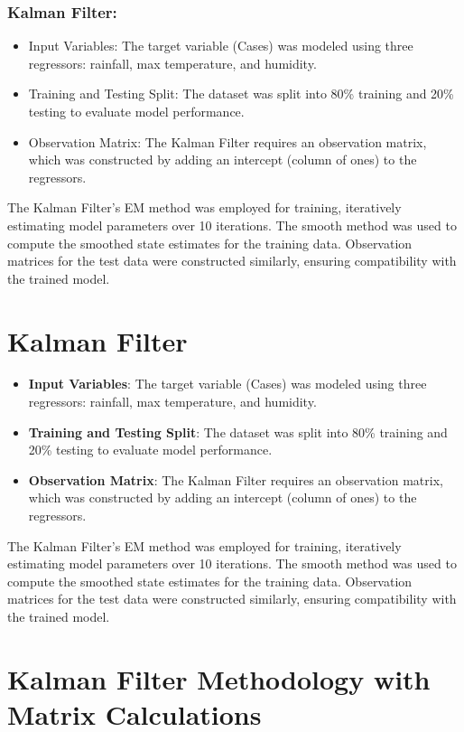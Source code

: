 \subsubsection{Kalman Filter:}
\begin{itemize}
	\item Input Variables: The target variable (Cases) was modeled using three regressors: rainfall, max temperature, and humidity.
	\item Training and Testing Split: The dataset was split into 80\% training and 20\% testing to evaluate model performance.
	\item Observation Matrix: The Kalman Filter requires an observation matrix, which was constructed by adding an intercept (column of ones) to the regressors.
\end{itemize}

The Kalman Filter's EM method was employed for training, iteratively estimating model parameters over 10 iterations. The smooth method was used to compute the smoothed state estimates for the training data. Observation matrices for the test data were constructed similarly, ensuring compatibility with the trained model.

\section{Kalman Filter}

\begin{itemize}
	\item \textbf{Input Variables}: The target variable (Cases) was modeled using three regressors: rainfall, max temperature, and humidity.
	\item \textbf{Training and Testing Split}: The dataset was split into 80\% training and 20\% testing to evaluate model performance.
	\item \textbf{Observation Matrix}: The Kalman Filter requires an observation matrix, which was constructed by adding an intercept (column of ones) to the regressors.
\end{itemize}

The Kalman Filter's EM method was employed for training, iteratively estimating model parameters over 10 iterations. The smooth method was used to compute the smoothed state estimates for the training data. Observation matrices for the test data were constructed similarly, ensuring compatibility with the trained model.

\section{Kalman Filter Methodology with Matrix Calculations}

